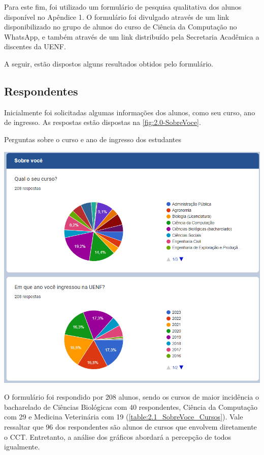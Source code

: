 Para este fim, foi utilizado um formulário de pesquisa qualitativa dos alunos disponível no Apêndice 1. O formulário foi divulgado através de um link disponibilizado no grupo de alunos do curso de Ciência da Computação no WhatsApp, e também através de um link distribuído pela Secretaria Acadêmica a discentes da UENF.

A seguir, estão dispostos alguns resultados obtidos pelo formulário.

\subsection{Respondentes} %

Inicialmente foi solicitadas algumas informações dos alunos, como seu curso, ano de ingresso. As respostas estão dispostas na \autoref{fig:2.0-SobreVoce}.

\begin{MyCenteredFigure}
  \caption{Perguntas sobre o curso e ano de ingresso dos estudantes}
  \label{fig:2.0-SobreVoce}
  \includegraphics[width=\textwidth]{files/img/Forms/2.0-SobreVoce}
\end{MyCenteredFigure} %

O formulário foi respondido por 208 alunos, sendo os cursos de maior incidência o bacharelado de Ciências Biológicas com 40 respondentes, Ciência da Computação com 29 e Medicina Veterinária com 19 (\autoref{table:2.1_SobreVoce_Cursos}). Vale ressaltar que 96 dos respondentes são alunos de cursos que envolvem diretamente o CCT. Entretanto, a análise dos gráficos abordará a percepção de todos igualmente.

